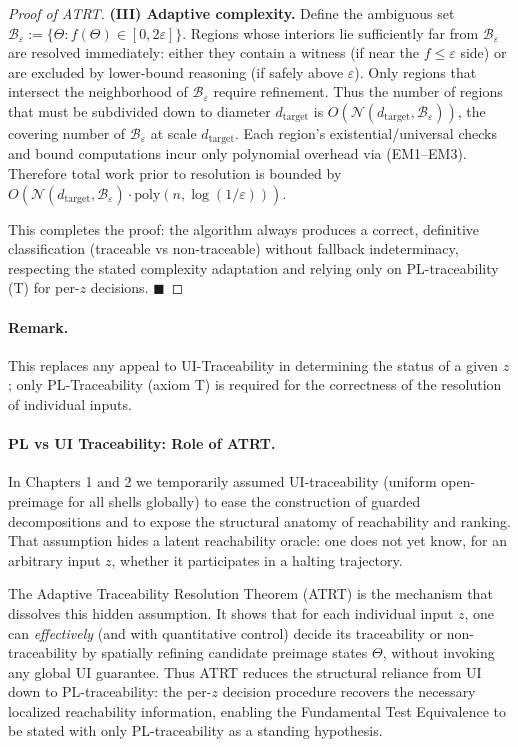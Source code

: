 \documentclass[12pt]{article}
\theoremstyle{definition}
\theoremstyle{plain}
\begin{document}
\begin{proof}[Proof of ATRT]
\textbf{(III) Adaptive complexity.}  
Define the ambiguous set \(\mathcal B_{\varepsilon} := \{\Theta : f(\Theta)\in[0,2\varepsilon]\}\). Regions whose interiors lie sufficiently far from \(\mathcal B_{\varepsilon}\) are resolved immediately: either they contain a witness (if near the \(f\le\varepsilon\) side) or are excluded by lower-bound reasoning (if safely above \(\varepsilon\)). Only regions that intersect the neighborhood of \(\mathcal B_{\varepsilon}\) require refinement. Thus the number of regions that must be subdivided down to diameter \(d_{\mathrm{target}}\) is \(O(\mathcal N(d_{\mathrm{target}}, \mathcal B_{\varepsilon}))\), the covering number of \(\mathcal B_{\varepsilon}\) at scale \(d_{\mathrm{target}}\). Each region’s existential/universal checks and bound computations incur only polynomial overhead via (EM1–EM3). Therefore total work prior to resolution is bounded by \(O\!\left(\mathcal N(d_{\mathrm{target}}, \mathcal B_{\varepsilon})\cdot \mathrm{poly}(n,\log(1/\varepsilon))\right)\).

This completes the proof: the algorithm always produces a correct, definitive classification (traceable vs non-traceable) without fallback indeterminacy, respecting the stated complexity adaptation and relying only on PL-traceability (T) for per-\(z\) decisions. \hfill\(\blacksquare\)
\end{proof}


\paragraph{Remark.} This replaces any appeal to UI-Traceability in determining the status of a given \(z\); only PL-Traceability (axiom T) is required for the correctness of the resolution of individual inputs.


\paragraph{PL vs UI Traceability: Role of ATRT.}  
In Chapters 1 and 2 we temporarily assumed UI-traceability (uniform open-preimage for all shells globally) to ease the construction of guarded decompositions and to expose the structural anatomy of reachability and ranking. That assumption hides a latent reachability oracle: one does not yet know, for an arbitrary input \(z\), whether it participates in a halting trajectory. 

The Adaptive Traceability Resolution Theorem (ATRT) is the mechanism that dissolves this hidden assumption. It shows that for each individual input \(z\), one can \emph{effectively} (and with quantitative control) decide its traceability or non-traceability by spatially refining candidate preimage states \(\Theta\), without invoking any global UI guarantee. Thus ATRT reduces the structural reliance from UI down to PL-traceability: the per-\(z\) decision procedure recovers the necessary localized reachability information, enabling the Fundamental Test Equivalence to be stated with only PL-traceability as a standing hypothesis. 
\end{document}
